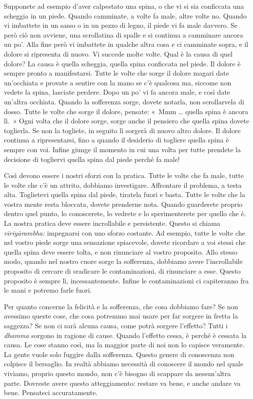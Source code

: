 Supponete ad esempio d'aver calpestato una spina, o che vi si sia
conficcata una scheggia in un piede. Quando camminate, a volte fa male,
altre volte no. Quando vi imbattete in un sasso o in un pezzo di legno,
il piede vi fa male davvero. Se però ciò non avviene, una scrollatina di
spalle e si continua a camminare ancora un po'. Alla fine però vi
imbattete in qualche altra cosa e ci camminate sopra, e il dolore si
ripresenta di nuovo. Vi succede molte volte. Qual è la causa di quel
dolore? La causa è quella scheggia, quella spina conficcata nel piede.
Il dolore è sempre pronto a manifestarsi. Tutte le volte che sorge il
dolore magari date un'occhiata e provate a sentire con la mano se c'è
qualcosa ma, siccome non vedete la spina, lasciate perdere. Dopo un po'
vi fa ancora male, e così date un'altra occhiata. Quando la sofferenza
sorge, dovete notarla, non scrollarvela di dosso. Tutte le volte che
sorge il dolore, pensate: «~Mmm \ldots{} quella spina è ancora lì.~» Ogni
volta che il dolore sorge, sorge anche il pensiero che quella spina
dovete toglierla. Se non la togliete, in seguito lì sorgerà di nuovo
altro dolore. Il dolore continua a ripresentarsi, fino a quando il
desiderio di togliere quella spina è sempre con voi. Infine giunge il
momento in cui una volta per tutte prendete la decisione di togliervi
quella spina dal piede perché fa male!

Così devono essere i nostri sforzi con la pratica. Tutte le volte che fa
male, tutte le volte che c'è un attrito, dobbiamo investigare.
Affrontare il problema, a testa alta. Toglietevi quella spina dal piede,
tiratela fuori e basta. Tutte le volte che la vostra mente resta
bloccata, dovete prenderne nota. Quando guarderete proprio dentro quel
punto, lo conoscerete, lo vedrete e lo sperimenterete per quello che è.
La nostra pratica deve essere incrollabile e persistente. Questo si
chiama \emph{viriyārambha:} impegnarsi con uno sforzo costante. Ad
esempio, tutte le volte che nel vostro piede sorge una sensazione
spiacevole, dovete ricordare a voi stessi che quella spina deve essere
tolta, e non rinunciare al vostro proposito. Allo stesso modo, quando
nel nostro cuore sorge la sofferenza, dobbiamo avere l'incrollabile
proposito di cercare di sradicare le contaminazioni, di rinunciare a
esse. Questo proposito è sempre lì, incessantemente. Infine le
contaminazioni ci capiteranno fra le mani e potremo farle fuori.

Per quanto concerne la felicità e la sofferenza, che cosa dobbiamo fare?
Se non avessimo queste cose, che cosa potremmo mai usare per far sorgere
in fretta la saggezza? Se non ci sarà alcuna causa, come potrà sorgere
l'effetto? Tutti i \emph{dhamma} sorgono in ragione di cause. Quando
l'effetto cessa, è perché è cessata la causa. Le cose stanno così, ma la
maggior parte di noi non lo capisce veramente. La gente vuole solo
fuggire dalla sofferenza. Questo genere di conoscenza non colpisce il
bersaglio. In realtà abbiamo necessità di conoscere il mondo nel quale
viviamo, proprio questo mondo, non c'è bisogno di scappare da
nessun'altra parte. Dovreste avere questo atteggiamento: restare va
bene, e anche andare va bene. Pensateci accuratamente.

